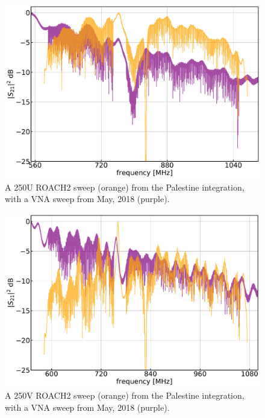 \begin{figure}[!htbp]
\centering
\includegraphics[width=\textwidth]{figures/blast_data/sweeps/250U_VNA_overplot}
\caption[~A 250U ROACH2 sweep from the Palestine integration, with a VNA sweep from May, 2018.]{A 250U ROACH2 sweep (orange) from the Palestine integration, with a VNA sweep from May, 2018 (purple).}
\label{fig:VNA comp 250U}
\end{figure}

\begin{figure}[!htbp]
\centering
\includegraphics[width=\textwidth]{figures/blast_data/sweeps/250V_VNA_overplot}
\caption[~A 250V ROACH2 sweep from the Palestine integration, with a VNA sweep from May, 2018.]{A 250V ROACH2 sweep (orange) from the Palestine integration, with a VNA sweep from May, 2018 (purple).}
\label{fig:VNA comp 250V}
\end{figure}

